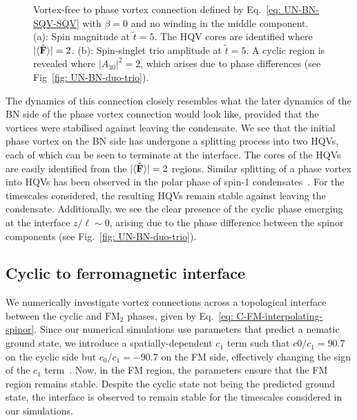 \begin{figure}
\begin{subfigure}{0.45\textwidth}
        \caption{}
    \end{subfigure}
    \caption[Dynamics of a singly quantised vortex to vortex-free connection in
    a uniaxial nematic to biaxial nematic interface]
    {\label{fig: UN-BN-VF-SQV} Vortex-free to phase vortex connection defined
    by Eq.~\eqref{eq: UN-BN-SQV-SQV} with \(\beta=0\) and no winding in the
    middle component.
    (a): Spin magnitude at \(\tilde{t}=5\). The HQV cores are identified where
    \(|\langle \hat{\vb{F}} \rangle | = 2\).
    (b): Spin-singlet trio amplitude at \(\tilde{t} = 5\). A cyclic region is
    revealed where \(|A_{30}|^2 = 2\), which arises due to phase differences
    (see Fig~\ref{fig: UN-BN-duo-trio}).}
\end{figure}
The dynamics of this connection closely resembles what the later dynamics of the
BN side of the phase vortex connection would look like, provided that the
vortices were stabilised against leaving the condensate.
We see that the initial phase vortex on the BN side has undergone a splitting
process into two HQVs, each of which can be seen to terminate at the interface.
The cores of the HQVs are easily identified from the
\(|\langle \hat{\vb{F}} \rangle | = 2\) regions.
Similar splitting of a phase vortex into HQVs has been observed in the polar
phase of spin-1 condensates~\cite{Seo2015, Xiao2021}.
For the timescales considered, the resulting HQVs remain stable against
leaving the condensate.
Additionally, we see the clear presence of the cyclic phase emerging at the
interface \(z / \ell \sim 0\), arising due to the phase difference between
the spinor components (see Fig.~\ref{fig: UN-BN-duo-trio}).

\subsection{Cyclic to ferromagnetic interface}
We numerically investigate vortex connections across a topological interface
between the cyclic and \(\text{FM}_2\) phases, given by
Eq.~\eqref{eq: C-FM-interpolating-spinor}.
Since our numerical simulations use parameters that predict a nematic ground
state, we introduce a spatially-dependent \(c_1\) term such that \(c0/c_1=90.7\)
on the cyclic side but \(c_0/c_1=-90.7\) on the FM side, effectively changing
the sign of the \(c_1\) term~\cite{Fatemi2000,Papoular2010}.
Now, in the FM region, the parameters ensure that the FM region remains stable.
Despite the cyclic state not being the predicted ground state, the interface
is observed to remain stable for the timescales considered in our simulations.

